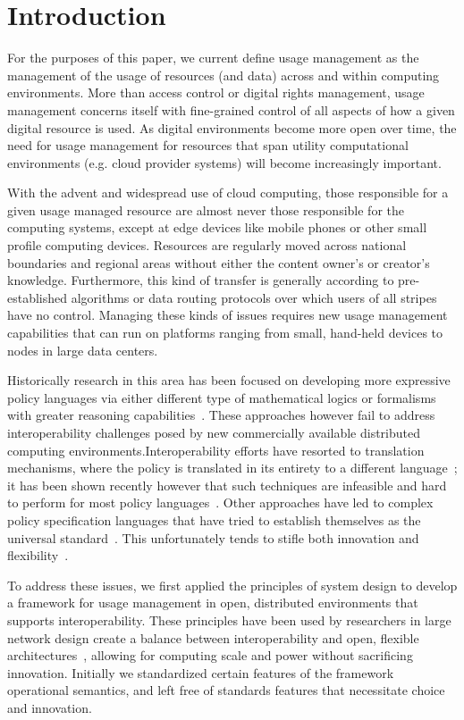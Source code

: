 \section{Introduction}
For the purposes of this paper, we current define usage management as the management of the usage of resources (and data) across and within computing environments.  More than access control or digital rights management, usage management concerns itself with fine-grained control of all aspects of how a given digital resource is used.  As digital environments become more open over time, the need for usage management for resources that span utility computational environments (e.g. cloud provider systems) will become increasingly important.

With the advent and widespread use of cloud computing, those responsible for a given usage managed resource are almost never those responsible for the computing systems, except at edge devices like mobile phones or other small profile computing devices.  Resources are regularly moved across national boundaries and regional areas without either the content owner's or creator's knowledge.  Furthermore, this kind of transfer is generally according to pre-established algorithms or data routing protocols over which users of all stripes have no control.  Managing these kinds of issues requires new usage management capabilities that can run on platforms ranging from small, hand-held devices to nodes in large data centers.

Historically research in this area has been focused on developing more expressive policy languages via either different type of mathematical logics or formalisms with greater reasoning capabilities~\cite{ArHu:07,BaMi:06,ChCoEtHaJoLa:03,HaWe:04,HaWe:08,PuWe:02,XiBjFu:08}.  These approaches however fail to address interoperability challenges posed by new commercially available distributed computing environments.Interoperability efforts have resorted to translation mechanisms, where the policy is translated in its entirety to a different language~\cite{HeJa:05,PoPrDe:04,ScTaWo:04}; it has been shown recently however that such techniques are infeasible and hard to perform for most policy languages~\cite{KoLaMaMi:04, SaShUe:04}. Other approaches have led to complex policy specification languages that have tried to establish themselves as the universal standard~\cite{OMADRM,ODRL-req,Wa:04,XrML-spec}.  This unfortunately tends to stifle both innovation and flexibility~\cite{HeJa:05,JaHe:04,JaHe:08,JaHeMa:06}.

To address these issues, we first applied the principles of system design to develop a framework for usage management in open, distributed environments that supports interoperability. These principles have been used by researchers in large network design create a balance between interoperability and open, flexible architectures~\cite{Al:04,BlCl:01,ClWrSoBr:02}, allowing for computing scale and power without sacrificing innovation. Initially we standardized certain features of the framework operational semantics, and left free of standards features that necessitate choice and innovation.


